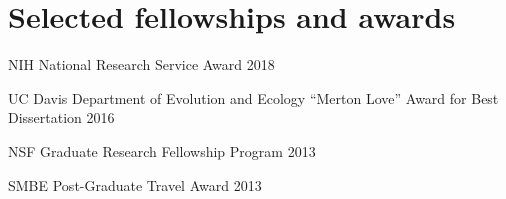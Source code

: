 \documentclass[letterpaper]{article}
\renewenvironment{itemize}{
  \begin{list}{}{
    \setlength{\leftmargin}{1.5em}
  }
}{
  \end{list}
}
\begin{document}
\section*{Selected fellowships and awards}
\begin {itemize}
\item NIH National Research Service Award 2018
\item UC Davis Department of Evolution and Ecology ``Merton Love'' Award for Best Dissertation 2016
\item NSF Graduate Research Fellowship Program 2013
\item SMBE Post-Graduate Travel Award 2013

\end{itemize}

\end{document}
